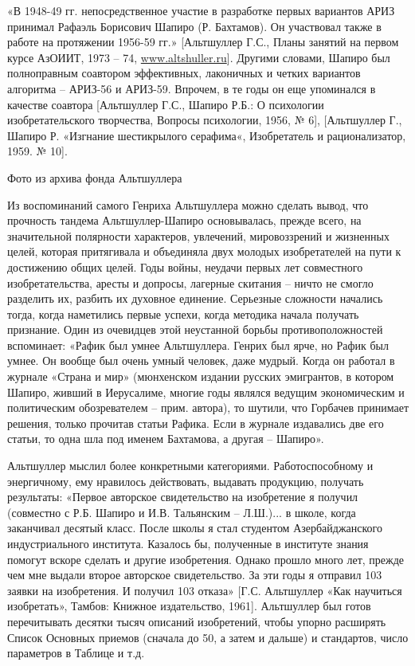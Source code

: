 \documentclass[11pt,a4paper]{article}
\begin{document}
«В 1948-49 гг. непосредственное участие в разработке первых вариантов АРИЗ
принимал Рафаэль Борисович Шапиро (Р. Бахтамов). Он участвовал также в работе
на протяжении 1956-59 гг.» [Альтшуллер Г.С., Планы занятий на первом курсе
  АзОИИТ, 1973 -- 74, \url{www.altshuller.ru}]. Другими словами, Шапиро был
полноправным соавтором эффективных, лаконичных и четких вариантов алгоритма --
АРИЗ-56 и АРИЗ-59. Впрочем, в те годы он еще упоминался в качестве соавтора
[Альтшуллер Г.С., Шапиро Р.Б.: О психологии изобретательского творчества,
  Вопросы психологии, 1956, № 6], [Альтшуллер Г., Шапиро Р. «Изгнание
  шестикрылого серафима«, Изобретатель и рационализатор, 1959. № 10].

Фото из архива фонда Альтшуллера

Из воспоминаний самого Генриха Альтшуллера можно сделать вывод, что прочность
тандема Альтшуллер-Шапиро основывалась, прежде всего, на значительной
полярности характеров, увлечений, мировоззрений и жизненных целей, которая
притягивала и объединяла двух молодых изобретателей на пути к достижению общих
целей. Годы войны, неудачи первых лет совместного изобретательства, аресты и
допросы, лагерные скитания -- ничто не смогло разделить их, разбить их
духовное единение. Серьезные сложности начались тогда, когда наметились первые
успехи, когда методика начала получать признание. Один из очевидцев этой
неустанной борьбы противоположностей вспоминает: «Рафик был умнее
Альтшуллера. Генрих был ярче, но Рафик был умнее. Он вообще был очень умный
человек, даже мудрый. Когда он работал в журнале «Страна и мир» (мюнхенском
издании русских эмигрантов, в котором Шапиро, живший в Иерусалиме, многие годы
являлся ведущим экономическим и политическим обозревателем -- прим. автора),
то шутили, что Горбачев принимает решения, только прочитав статьи Рафика. Если
в журнале издавались две его статьи, то одна шла под именем Бахтамова, а
другая -- Шапиро».

Альтшуллер мыслил более конкретными категориями. Работоспособному и
энергичному, ему нравилось действовать, выдавать продукцию, получать
результаты: «Первое авторское свидетельство на изобретение я получил
(совместно с Р.Б. Шапиро и И.В. Тальянским -- Л.Ш.)... в школе, когда
заканчивал десятый класс. После школы я стал студентом Азербайджанского
индустриального института. Казалось бы, полученные в институте знания помогут
вскоре сделать и другие изобретения. Однако прошло много лет, прежде чем мне
выдали второе авторское свидетельство. За эти годы я отправил 103 заявки на
изобретения. И получил 103 отказа» [Г.С. Альтшуллер «Как научиться
  изобретать», Тамбов: Книжное издательство, 1961]. Альтшуллер был готов
перечитывать десятки тысяч описаний изобретений, чтобы упорно расширять Список
Основных приемов (сначала до 50, а затем и дальше) и стандартов, число
параметров в Таблице и т.д.
\end{document}
